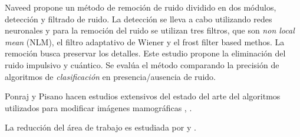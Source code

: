 Naveed \cite{naveed2012quantum} propone un método de remoción de ruido dividido
en dos módulos, detección y filtrado de ruido. La detección se lleva a cabo
utilizando redes neuronales y para la remoción del ruido se utilizan tres
filtros, que son \textit{non local mean} (NLM), el filtro adaptativo de Wiener
y el frost filter based methos. La remoción busca preservar los detalles. Este
estudio propone la eliminación del ruido impulsivo y cuántico. Se evalúa el
método comparando la precisión de algoritmos de \textit{clasificación} en
presencia/ausencia de ruido.


Ponraj y Pisano hacen estudios extensivos del estado del arte del algoritmos
utilizados para modificar imágenes mamográficas \cite{ponraj2011survey},
\cite{pisano2000image}.

La reducción del área de trabajo es estudiada por \cite{holguinpre} y
\cite{dehghani2011method}.


